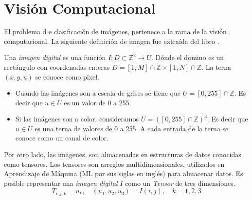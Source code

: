     \section{Visión Computacional}
    El problema d e clasificación de imágenes, pertenece a la rama de la visión computacional. La siguiente definición de imagen fue extraída del libro \cite{computer_vision}.
    \begin{definition}
        \label{digital_image}
        Una \textsl{imagen digital} es una función $I:  D \subset \mathbb Z^2 \to U$. Dónde el domino es un rectángulo con coordenadas enteras $D = [1,M]\cap \mathbb Z \times [1,N] \cap \mathbb Z$. La terna $(x,y,u)$ se conoce como pixel.
        \begin{itemize}
            \item Cuando las imágenes son a escala de grises se tiene que $U=[0,255]\cap \mathbb Z$. Es decir que $u\in U$ es un valor de 0 a 255.
            \item Si las imágenes son a color, consideramos $U=([0,255]\cap \mathbb Z)^3$. Es decir que $u\in U$ es una terna de valores de 0 a 255. A cada entrada de la terna se conoce como un canal de color.
        \end{itemize}
    \end{definition}
    Por otro lado, las imágenes, son almacenadas en estructuras de datos conocidas como tensores. Los tensores son arreglos multidimensionales, utilizados en Aprendizaje de Máquina (ML por sus siglas en inglés) para almacenar datos. Es posible representar una \textsl{imagen digital} $I$ como un \textsl{Tensor} de tres dimensiones.
    \begin{equation}
        T_{i,j,k} = u_k, \quad (u_1, u_2, u_3) = I(i,j), \quad k=1,2,3
    \end{equation}
